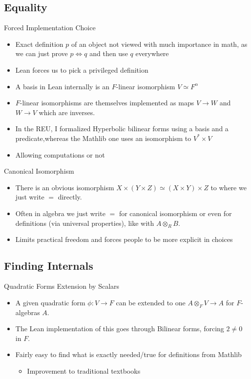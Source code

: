 \documentclass[svgnames]{beamer}
\begin{document}
\subsection{Equality}

\begin{frame}{Forced Implementation Choice}
\begin{itemize}[<+->]
    \item Exact definition $p$ of an object not viewed with much importance in math, as we can just prove $p \iff q$ and then use $q$ everywhere
    \item Lean forces us to pick a privileged definition
    \item A basis in Lean internally is an $F$-linear isomorphism $V \simeq F^\alpha$
    \item $F$-linear isomorphisms are themselves implemented as maps $V \to W$ and $W \to V$ which are inverses. 
    \item In the REU, I formalized Hyperbolic bilinear forms using a basis and a predicate,\pause whereas the Mathlib one uses an isomorphism to $V^* \times V$
    \item Allowing computations or not
\end{itemize}
\end{frame}

\begin{frame}{Canonical Isomorphism}
\begin{itemize}[<+->]
    \item There is an obvious isomorphism $X \times (Y \times Z) \simeq(X \times Y) \times Z $ to where we just write $=$ directly. 
    \item Often in algebra we just write $=$ for canonical isomorphism or even for definitions (via universal properties), like with $A \otimes_R B$. 
    \item Limits practical freedom and forces people to be more explicit in choices
\end{itemize}

\end{frame}

\subsection{Finding Internals}

\begin{frame}{Quadratic Forms Extension by Scalars}
\begin{itemize}[<+->]
    \item A given quadratic form $\phi: V \to F$ can be extended to one $A \otimes_F V \to A$ for $F$-algebras $A$. 
    \item The Lean implementation of this goes through Bilinear forms, forcing $2 \neq 0$ in $F$. 
    \item Fairly easy to find what is exactly needed/true for definitions from Mathlib
    \begin{itemize}[<+->]
        \item Improvement to traditional textbooks
    \end{itemize}
\end{itemize}
\end{frame}
\end{document}
